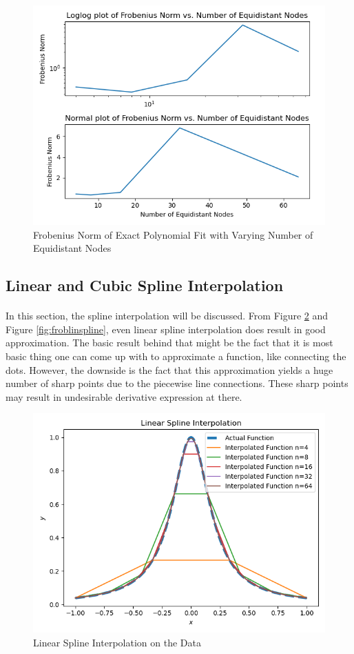 \documentclass[letterpaper,12pt]{article}
\begin{document}
\begin{figure}[H]
    \centerline{\includegraphics[width=\linewidth]{figures/frobpoly.png}}
    \caption{Frobenius Norm of Exact Polynomial Fit with Varying Number of Equidistant Nodes}
    \label{fig:frobpoly}
    \end{figure}
        

\subsection{Linear and Cubic Spline Interpolation}
\paragraph{} In this section, the spline interpolation will be discussed. From Figure \ref{fig:linspline} and Figure \ref{fig:froblinspline}, even linear spline interpolation does result in good approximation. The basic result behind that might be the fact that it is most basic thing one can come up with to approximate a function, like connecting the dots. However, the downside is the fact that this approximation yields a huge number of sharp points due to the piecewise line connections. These sharp points may result in undesirable derivative expression at there.

\begin{figure}[H]
    \centerline{\includegraphics[width=0.8\linewidth]{figures/linspline.png}}
    \caption{Linear Spline Interpolation on the Data}
    \label{fig:linspline}
    \end{figure}
\end{document}
